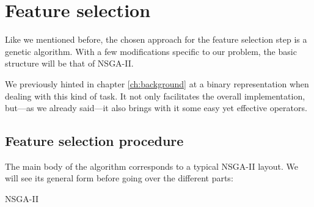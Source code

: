 \chapter{Feature selection}\label{ch:featureselection}

Like we mentioned before, the chosen approach for the feature selection step is a genetic algorithm. With a few modifications specific to our problem, the basic structure will be that of \acs{NSGA-II}.

We previously hinted in chapter \ref{ch:background} at a binary representation when dealing with this kind of task. It not only facilitates the overall implementation, but---as we already said---it also brings with it some easy yet effective operators.

\section{Feature selection procedure}

	The main body of the algorithm corresponds to a typical \acs{NSGA-II} layout. We will see its general form before going over the different parts:

	\vspace{0.3cm}

	\begin{algorithm}[H]


		\caption{NSGA-II}

	\end{algorithm}


